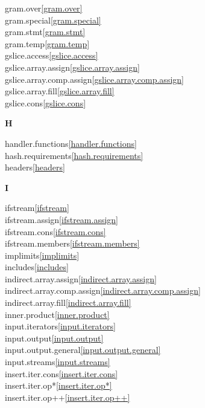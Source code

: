 \begin{multicols}{2}
gram.over\quad\ref{gram.over}\\
gram.special\quad\ref{gram.special}\\
gram.stmt\quad\ref{gram.stmt}\\
gram.temp\quad\ref{gram.temp}\\
gslice.access\quad\ref{gslice.access}\\
gslice.array.assign\quad\ref{gslice.array.assign}\\
gslice.array.comp.assign\quad\ref{gslice.array.comp.assign}\\
gslice.array.fill\quad\ref{gslice.array.fill}\\
gslice.cons\quad\ref{gslice.cons}\\
\par \textbf{H}\par
handler.functions\quad\ref{handler.functions}\\
hash.requirements\quad\ref{hash.requirements}\\
headers\quad\ref{headers}\\
\par \textbf{I}\par
ifstream\quad\ref{ifstream}\\
ifstream.assign\quad\ref{ifstream.assign}\\
ifstream.cons\quad\ref{ifstream.cons}\\
ifstream.members\quad\ref{ifstream.members}\\
implimits\quad\ref{implimits}\\
includes\quad\ref{includes}\\
indirect.array.assign\quad\ref{indirect.array.assign}\\
indirect.array.comp.assign\quad\ref{indirect.array.comp.assign}\\
indirect.array.fill\quad\ref{indirect.array.fill}\\
inner.product\quad\ref{inner.product}\\
input.iterators\quad\ref{input.iterators}\\
input.output\quad\ref{input.output}\\
input.output.general\quad\ref{input.output.general}\\
input.streams\quad\ref{input.streams}\\
insert.iter.cons\quad\ref{insert.iter.cons}\\
insert.iter.op*\quad\ref{insert.iter.op*}\\
insert.iter.op++\quad\ref{insert.iter.op++}\\

\end{multicols}
